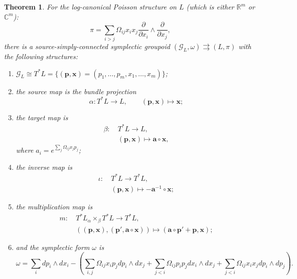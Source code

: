 \documentclass{amsart}
\newtheorem{theorem}{Theorem}[section]
\newcommand{\bfa}{\mathbf{a}}
\newcommand{\bfp}{\mathbf{p}}
\newcommand{\bfx}{\mathbf{x}}
\newcommand{\cG}{\mathcal{G}}
\newcommand{\CC}{\mathbb{C}}
\newcommand{\RR}{\mathbb{R}}
\newcommand{\rra}{\rightrightarrows}
\begin{document}
\begin{theorem} \label{thm:PoiSpLogC}
For the log-canonical Poisson structure on $L$ (which is either $\RR^m$ or $\CC^m$):
$$
	\pi = \sum_{i > j} \Omega_{ij} x_i x_j\frac{\partial}{\partial x_i} \wedge \frac{\partial}{\partial x_j},
$$
there is a source-simply-connected symplectic groupoid $(\cG_L, \omega) \rra (L, \pi)$ with the following structures:
	\begin{enumerate}
		\item $\cG_L \cong T^*L = \{(\bfp, \bfx) = (p_1, \ldots, p_m, x_1, \ldots, x_m)\}$;
		\item the source map is the bundle projection
			$$
				\alpha: T^*L \to L, \qquad (\bfp, \bfx) \mapsto \bfx;
			$$
		\item the target map is
			$$
				\begin{aligned}
				\beta:~ & T^*L \to L, \\
				& (\bfp, \bfx) \mapsto \bfa \circ \bfx,
				\end{aligned}
			$$
			where $a_i = e^{\sum\limits_{j} \Omega_{ij} x_jp_j}$;
		\item the inverse map is
			$$
				\begin{aligned}
				\iota:~ & T^*L \to T^*L, \\
				& (\bfp, \bfx) \mapsto -\bfa^{-1}\circ \bfx;
				\end{aligned}
			$$ 
		\item the multiplication map is
			$$
				\begin{aligned}
				m:~ & T^*L {_\alpha \times_\beta} T^*L \to T^*L, \\
				& ((\bfp, \bfx), (\bfp', \bfa \circ \bfx)) \mapsto (\bfa \circ \bfp' + \bfp, \bfx );
				\end{aligned}
			$$
		\item and the symplectic form $\omega$ is
		$$
			\omega = \sum_{i} dp_i \wedge dx_i
			- \left(
			\sum_{i, j} \Omega_{ij}x_i p_j d p_i \wedge d x_j 
			+ \sum_{j < i} \Omega_{ij}p_ip_j d x_i \wedge d x_j
			+ \sum_{j < i} \Omega_{ij}x_ix_j d p_i \wedge d p_j
			\right).
		$$
	\end{enumerate}
\end{theorem}
\end{document}
